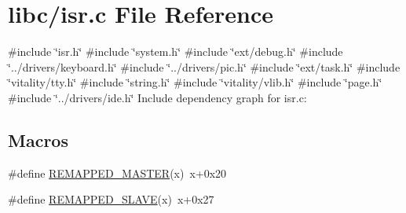 \hypertarget{a00107}{}\section{libc/isr.c File Reference}
\label{a00107}
{\ttfamily \#include \char`\"{}isr.\+h\char`\"{}}\newline
{\ttfamily \#include \char`\"{}system.\+h\char`\"{}}\newline
{\ttfamily \#include \char`\"{}ext/debug.\+h\char`\"{}}\newline
{\ttfamily \#include \char`\"{}../drivers/keyboard.\+h\char`\"{}}\newline
{\ttfamily \#include \char`\"{}../drivers/pic.\+h\char`\"{}}\newline
{\ttfamily \#include \char`\"{}ext/task.\+h\char`\"{}}\newline
{\ttfamily \#include \char`\"{}vitality/tty.\+h\char`\"{}}\newline
{\ttfamily \#include \char`\"{}string.\+h\char`\"{}}\newline
{\ttfamily \#include \char`\"{}vitality/vlib.\+h\char`\"{}}\newline
{\ttfamily \#include \char`\"{}page.\+h\char`\"{}}\newline
{\ttfamily \#include \char`\"{}../drivers/ide.\+h\char`\"{}}\newline
Include dependency graph for isr.\+c\+:
\subsection*{Macros}
\begin{DoxyCompactItemize}
\item 
\#define \hyperlink{a00107_a1a50e87666fd36809857ecdf02ec1e0e_a1a50e87666fd36809857ecdf02ec1e0e}{R\+E\+M\+A\+P\+P\+E\+D\+\_\+\+M\+A\+S\+T\+ER}(x)~x+0x20
\item 
\#define \hyperlink{a00107_a29460f6684e5755f5e6b832df15dec97_a29460f6684e5755f5e6b832df15dec97}{R\+E\+M\+A\+P\+P\+E\+D\+\_\+\+S\+L\+A\+VE}(x)~x+0x27
\end{DoxyCompactItemize}
